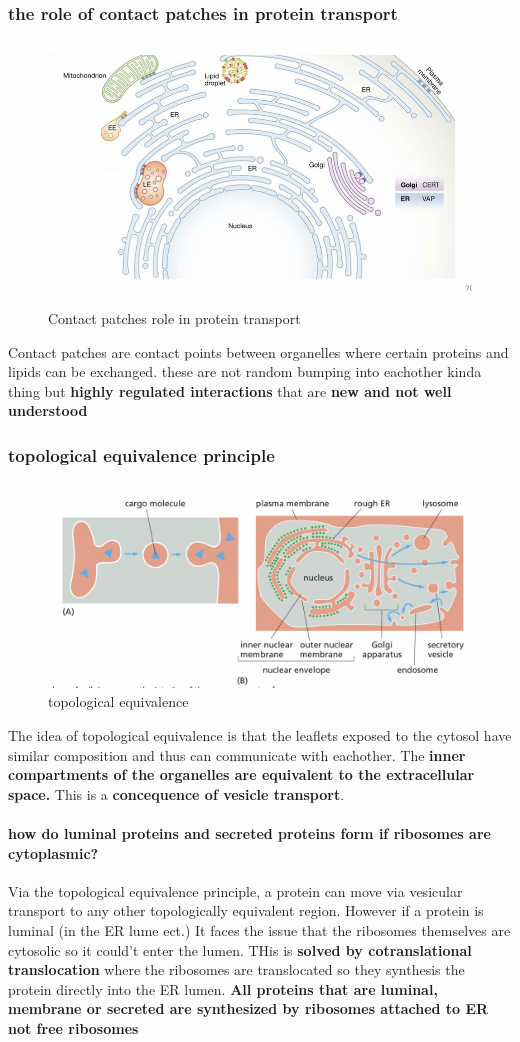 \documentclass[../main.tex]{subfiles}
\begin{document}
\subsubsection{the role of contact patches in protein transport}
\begin{figure}[H]
    \centering
    \includegraphics[width=0.5\linewidth]{contact.png}
    \caption{Contact patches role in protein transport}
    \label{fig:enter-label}
\end{figure}
Contact patches are contact points between organelles where certain proteins and lipids can be exchanged. these are not random bumping into eachother kinda thing but \textbf{highly regulated interactions} that are \textbf{new and not well understood}

\subsubsection{topological equivalence principle}
\begin{figure}[H]
    \centering
    \includegraphics[width=0.5\linewidth]{topologicalEquivalence.png}
    \caption{topological equivalence}
    \label{fig:enter-label}
\end{figure}
The idea of topological equivalence is that the leaflets exposed to the cytosol have similar composition and thus can communicate with eachother. The \textbf{inner compartments of the organelles are equivalent to the extracellular space.} This is a \textbf{concequence of vesicle transport}.
\par
\paragraph{how do luminal proteins and secreted proteins form if ribosomes are cytoplasmic?}
Via the topological equivalence principle, a protein can move via vesicular transport to any other topologically equivalent region. However if a protein is luminal (in the ER lume ect.) It faces the issue that the ribosomes themselves are cytosolic so it could't enter the lumen. THis is\textbf{ solved by cotranslational translocation} where the ribosomes are translocated so they synthesis the protein directly into the ER lumen. \textbf{All proteins that are luminal, membrane or secreted are synthesized by ribosomes attached to ER not free ribosomes}
\end{document}
